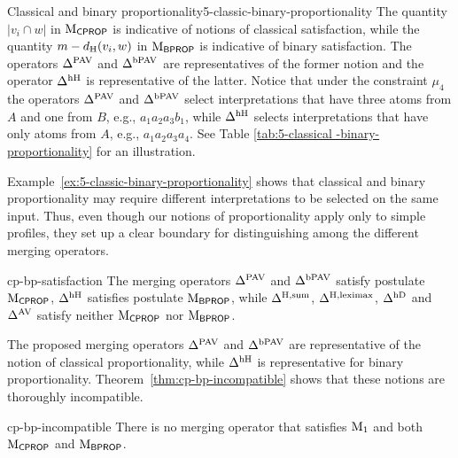 \begin{xmpl}{Classical and binary proportionality}{5-classic-binary-proportionality}
	The quantity $|v_i\cap w|$ in $\mathrm{M}_{\mathsf{CPROP}}$ is indicative of notions of classical  satisfaction,
	while the quantity $m-d_{\operatorname{H}}(v_i,w)$ in $\mathrm{M}_{\mathsf{BPROP}}$ is indicative of binary satisfaction.
	The operators $\Delta^{\mathrm{PAV}}_{}$ and $\Delta^{\mathrm{bPAV}}_{}$ are representatives of the former notion
	and the operator $\Delta^{\mathrm{hH}}_{}$ is representative of the latter.
	Notice that under the constraint $\mu_4$ 
	the operators $\Delta^{\mathrm{PAV}}_{}$ and $\Delta^{\mathrm{bPAV}}_{}$ select interpretations that have three atoms from $A$
	and one from $B$, e.g., $a_1a_2a_3b_1$, while $\Delta^{\mathrm{hH}}_{}$ selects interpretations
	that have only atoms from $A$, e.g., $a_1a_2a_3a_4$. 
	See Table \ref{tab:5-classical -binary-proportionality} for an illustration.
\end{xmpl}


Example~\ref{ex:5-classic-binary-proportionality}
shows that classical  and binary proportionality 
may require different interpretations to be selected on the same input.
Thus, even though our notions of proportionality apply only to simple profiles, 
they set up a clear boundary for distinguishing among the different merging operators.

\begin{thm}{\cite{HaretLPW20}}{cp-bp-satisfaction}
	The merging operators $\Delta^{\mathrm{PAV}}$ and $\Delta^{\mathrm{bPAV}}$ satisfy postulate $\mathrm{M}_{\mathsf{CPROP}}$,
	$\Delta^{\mathrm{hH}}{}$ satisfies postulate $\mathrm{M}_{\mathsf{BPROP}}$,
	while $\Delta^{{\operatorname{H}},{\operatorname{sum}}}{}$, $\Delta^{{\operatorname{H}},{\operatorname{leximax}}}{}$, $\Delta^{\mathrm{hD}}$ and $\Delta^{\mathrm{AV}}$
	satisfy neither $\mathrm{M}_{\mathsf{CPROP}}$ nor $\mathrm{M}_{\mathsf{BPROP}}$.
\end{thm}

 
The proposed merging operators $\Delta^{\mathrm{PAV}}$ and $\Delta^{\mathrm{bPAV}}$ 
are representative of the notion of classical  proportionality, while 
$\Delta^{\mathrm{hH}}{}$ is representative for binary proportionality. 
Theorem~\ref{thm:cp-bp-incompatible} shows that these notions are thoroughly incompatible.

\begin{thm}{\cite{HaretLPW20}}{cp-bp-incompatible}
	There is no merging operator that satisfies 
	$\mathrm{M}_{1}$ and 
	both $\mathrm{M}_{\mathsf{CPROP}}$ and $\mathrm{M}_{\mathsf{BPROP}}$.
\end{thm} 



















